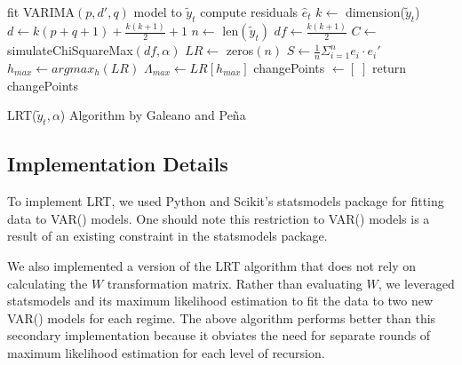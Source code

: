 \documentclass[12pt]{article}
\begin{document}
\begin{function}[H]
	\SetAlgoLined
	fit VARIMA$(p, d', q)$ model to $\tilde{y}_t$ \;
	compute residuals $\hat e_t$ \;
	\BlankLine
	$k \gets$ dimension($\tilde{y}_t$) \;
	$d \gets k(p + q + 1) + \frac{k(k+1)}{2} + 1$  
	$n \gets$ len$(\tilde{y}_t)$ \;
	$df \gets \frac{k(k+1)}{2}$  
	\BlankLine
	$C \gets $ simulateChiSquareMax$(df, \alpha)$  
	\BlankLine
	$LR \gets $ zeros$(n)$ \;
	$S \gets \frac{1}{n} \Sigma_{i=1}^n e_i \cdot e_i'$ \;
	\BlankLine
	$h_{max} \gets argmax_h(LR) $ \;
	$\Lambda_{max} \gets LR[h_{max}]$ \;
	\BlankLine
	changePoints $\gets [\;]$ \;
	\BlankLine
	return changePoints
 \caption{LRT($\tilde{y}_t, \alpha$) Algorithm by Galeano and Pe\~{n}a \cite{galeano2007covariance}}
\end{function}

\subsection{Implementation Details}

To implement LRT, we used Python and Scikit's statsmodels package for fitting data to VAR() models.
One should note this restriction to VAR() models is a result of an existing constraint in the statsmodels package. 

We also implemented a version of the LRT algorithm that does not rely on calculating the $W$ transformation matrix.
Rather than evaluating $W$, we leveraged statsmodels and its maximum likelihood estimation to fit the data to two new VAR() models for each regime.
The above algorithm performs better than this secondary implementation because it obviates the need for separate rounds of maximum likelihood estimation for each level of recursion.



\end{document}
